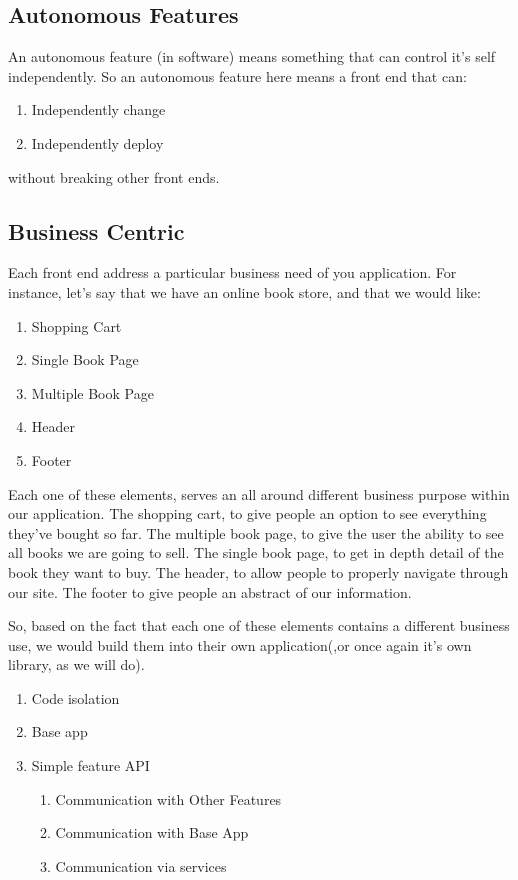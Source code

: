 \subsection{Autonomous Features}
An autonomous feature (in software) means something that can control it's self independently. So an autonomous feature here means a front end that can:
\begin{enumerate}
  \item Independently change 
  \item Independently deploy 
\end{enumerate}
without breaking other front ends. 

\subsection{Business Centric}
Each front end address a particular business need of you application.
For instance, let's say that we have an online book store, and that we would like:
\begin{enumerate}
  \item Shopping Cart
  \item Single Book Page
  \item Multiple Book Page
  \item Header
  \item Footer 
\end{enumerate}

Each one of these elements, serves an all around different business purpose within our application. The shopping cart, to give people an option to see everything they've bought so far. The multiple book page, to give the user the ability to see all books we are going to sell. The single book page, to get in depth detail of the book they want to buy. The header, to allow people to properly navigate through our site. The footer to give people an abstract of our information. 

So, based on the fact that each one of these elements contains a different business use, we would build them into their own application(,or once again it's own library, as we will do).

\begin{enumerate}
  \item Code isolation
  \item Base app
  \item Simple feature API
  \begin{enumerate}
    \item Communication with Other Features
    \item Communication with Base App
    \item Communication via services
  \end{enumerate}
\end{enumerate}


